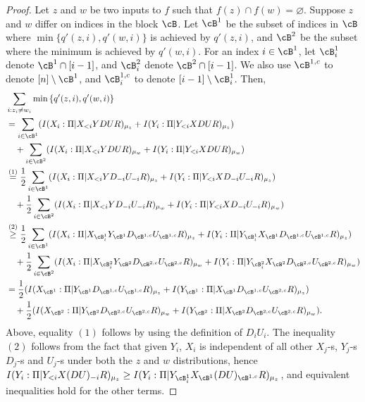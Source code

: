 \begin{proof}
Let $z$ and $w$ be two inputs to $f$ such that $f(z) \cap f(w) =\varnothing$. Suppose $z$ and $w$ differ on indices in the block $\cB$. Let $\cB^1$ be the subset of indices in $\cB$ where $\min\{q'(z,i),q'(w,i)\}$ is achieved by $q'(z,i)$, and $\cB^2$ be the subset where the minimum is achieved by $q'(w,i)$. For an index $i\in \cB^1$, let $\cB^1_i$ denote $\cB^1 \cap [i-1]$, and $\cB^2_i$ denote $\cB^2 \cap [i-1]$. We also use $\cB^{1,c}$ to denote $[n]\setminus\cB^1$, and $\cB^{1,c}_i$ to denote $[i-1]\setminus\cB^1_i$. Then,
\begin{align}
&\sum_{i: z_i \neq w_i}\min\left\{q'(z,i), q'(w,i)\right\} \nonumber \\
& = \sum_{i\in \cB^1}(I(X_i:\Pi|X_{<i}YDUR)_{\mu_z} + I(Y_i:\Pi|Y_{<i}XDUR)_{\mu_z}) \nonumber \\
& \quad + \sum_{i\in \cB^2}(I(X_i:\Pi|X_{<i}YDUR)_{\mu_w} + I(Y_i:\Pi|Y_{<i}XDUR)_{\mu_w}) \nonumber \\
& \overset{(1)}= \frac{1}{2}\sum_{i\in \cB^1}(I(X_i:\Pi|X_{<i}YD_{-i}U_{-i}R)_{\mu_z} + I(Y_i:\Pi|Y_{<i}XD_{-i}U_{-i}R)_{\mu_z}) \nonumber \\
& \quad + \frac{1}{2}\sum_{i\in \cB^2}(I(X_i:\Pi|X_{<i}YD_{-i}U_{-i}R)_{\mu_w} + I(Y_i:\Pi|Y_{<i}XD_{-i}U_{-i}R)_{\mu_w}) \nonumber \\
& \overset{(2)}\geq \frac{1}{2}\sum_{i\in \cB^1}(I(X_i:\Pi|X_{\cB^1_i}Y_{\cB^1}D_{\cB^{1,c}}U_{\cB^{1,c}}R)_{\mu_z} + I(Y_i:\Pi|Y_{\cB^1_i}X_{\cB^1}D_{\cB^{1,c}}U_{\cB^{1,c}}R)_{\mu_z}) \nonumber \\
& \quad + \frac{1}{2}\sum_{i\in \cB^2}(I(X_i:\Pi|X_{\cB^2_i}Y_{\cB^2}D_{\cB^{2,c}}U_{\cB^{2,c}}R)_{\mu_w} + I(Y_i:\Pi|Y_{\cB^2_i}X_{\cB^2}D_{\cB^{2,c}}U_{\cB^{2,c}}R)_{\mu_w}) \nonumber \\
& = \frac{1}{2}(I(X_{\cB^1}:\Pi|Y_{\cB^1}D_{\cB^{1,c}}U_{\cB^{1,c}}R)_{\mu_z} + I(Y_{\cB^1}:\Pi|X_{\cB^1}D_{\cB^{1,c}}U_{\cB^{2,c}}R)_{\mu_z}) \nonumber \\
& \quad + \frac{1}{2}(I(X_{\cB^2}:\Pi|Y_{\cB^2}D_{\cB^{2,c}}U_{\cB^{2,c}}R)_{\mu_w} + I(Y_{\cB^2}:\Pi|X_{\cB^2}D_{\cB^{2,c}}U_{\cB^{2,c}}R)_{\mu_w}). \label{inf_ineq}
\end{align}
Above, equality $(1)$ follows by using the definition of $D_iU_i$. The inequality $(2)$ follows from the fact that given $Y_i$, $X_i$ is independent of all other $X_j$-s, $Y_j$-s $D_j$-s and $U_j$-s under both the $z$ and $w$ distributions, hence $I(Y_i:\Pi|Y_{<i}X(DU)_{-i}R)_{\mu_z} \geq I(Y_i:\Pi|Y_{\cB^1_i}X_{\cB^1}(DU)_{\cB^{1,c}}R)_{\mu_z}$, and equivalent inequalities hold for the other terms.


\end{proof}
